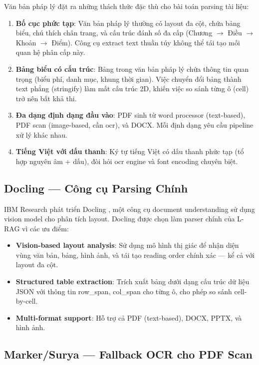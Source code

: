 Văn bản pháp lý đặt ra những thách thức đặc thù cho bài toán parsing tài liệu:

\begin{enumerate}[label=(\arabic*)]
    \item \textbf{Bố cục phức tạp}: Văn bản pháp lý thường có layout đa cột, chứa bảng biểu, chú thích chân trang, và cấu trúc đánh số đa cấp (Chương $\rightarrow$ Điều $\rightarrow$ Khoản $\rightarrow$ Điểm). Công cụ extract text thuần túy không thể tái tạo mối quan hệ phân cấp này.
    \item \textbf{Bảng biểu có cấu trúc}: Bảng trong văn bản pháp lý chứa thông tin quan trọng (biểu phí, danh mục, khung thời gian). Việc chuyển đổi bảng thành text phẳng (stringify) làm mất cấu trúc 2D, khiến việc so sánh từng ô (cell) trở nên bất khả thi.
    \item \textbf{Đa dạng định dạng đầu vào}: PDF sinh từ word processor (text-based), PDF scan (image-based, cần \gls{ocr}), và DOCX. Mỗi định dạng yêu cầu pipeline xử lý khác nhau.
    \item \textbf{Tiếng Việt với dấu thanh}: Ký tự tiếng Việt có dấu thanh phức tạp (tổ hợp nguyên âm + dấu), đòi hỏi \gls{ocr} engine và font encoding chuyên biệt.
\end{enumerate}

\subsection{Docling — Công cụ Parsing Chính}

IBM Research phát triển Docling \cite{docling2024}, một công cụ document understanding sử dụng vision model cho phân tích layout. Docling được chọn làm parser chính của L-RAG vì các ưu điểm:

\begin{itemize}
    \item \textbf{Vision-based layout analysis}: Sử dụng mô hình thị giác để nhận diện vùng văn bản, bảng, hình ảnh, và tái tạo reading order chính xác — kể cả với layout đa cột.
    \item \textbf{Structured table extraction}: Trích xuất bảng dưới dạng cấu trúc dữ liệu JSON với thông tin row\_span, col\_span cho từng ô, cho phép so sánh cell-by-cell.
    \item \textbf{Multi-format support}: Hỗ trợ cả PDF (text-based), DOCX, PPTX, và hình ảnh.
\end{itemize}

\subsection{Marker/Surya — Fallback OCR cho PDF Scan}

